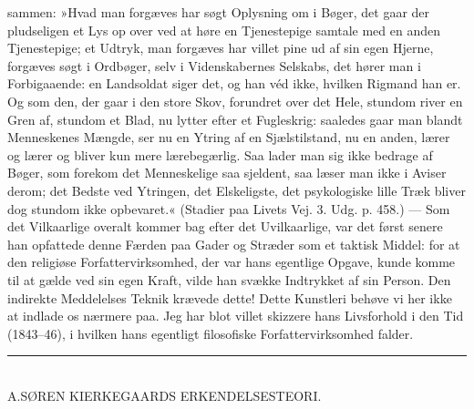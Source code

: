 \documentclass[12pt,a4paper,openany]{book}
\newcommand{\opage}[1]{\marginnote{\footnotesize\textit{[#1]}}}
\begin{document}
sammen: »Hvad man forgæves har søgt Oplysning om i
Bøger, det gaar der pludseligen et Lys op over ved at
høre en Tjenestepige samtale med en anden Tjenestepige;
et Udtryk, man forgæves har villet pine ud af sin egen
Hjerne, forgæves søgt i Ordbøger, selv i Videnskabernes
Selskabs, det hører man i Forbigaaende: en Landsoldat
siger det, og han véd ikke, hvilken Rigmand han er.
Og som den, der gaar i den store Skov, forundret over
det Hele, stundom river en Gren af, stundom et Blad,
nu lytter efter et Fugleskrig: saaledes gaar man blandt
Menneskenes Mængde, ser nu en Ytring af en Sjælstilstand,
nu en anden, lærer og lærer og bliver kun mere
lærebegærlig. Saa lader man sig ikke bedrage af Bøger,
som forekom det Menneskelige saa sjeldent, saa læser
man ikke i Aviser derom; det Bedste ved Ytringen, det
Elskeligste, det psykologiske lille Træk bliver dog stundom
ikke opbevaret.« (Stadier paa Livets Vej. 3. Udg.
\opage{58}p. 458.) --- Som det Vilkaarlige overalt kommer bag efter
det Uvilkaarlige, var det først senere han opfattede denne
Færden paa Gader og Stræder som et taktisk Middel:
for at den religiøse Forfattervirksomhed, der var hans
egentlige Opgave, kunde komme til at gælde ved sin egen
Kraft, vilde han svække Indtrykket af sin Person. Den
indirekte Meddelelses Teknik krævede dette! Dette
Kunstleri behøve vi her ikke at indlade os nærmere paa.
Jeg har blot villet skizzere hans Livsforhold i den Tid
(1843--46), i hvilken hans egentligt filosofiske Forfattervirksomhed
falder.

\begin{center}\rule{1.5cm}{0.4pt}\\[18pt] A.\quad SØREN KIERKEGAARDS ERKENDELSESTEORI.\end{center}
\end{document}
